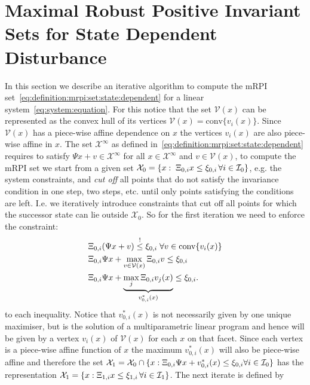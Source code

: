 \documentclass[letterpaper, 10pt, conference]{ieeeconf/ieeeconf} %
\providecommand{\conv}{\text{conv}}
\begin{document}
\section{Maximal Robust Positive Invariant Sets for State Dependent Disturbance}
In this section we describe an iterative algorithm to compute the mRPI 
set~\eqref{eq:definition:mrpi:set:state:dependent} for a linear system~\eqref{eq:system:equation}.
For this notice that the set $\mathcal V(x)$ can be represented as the convex hull of its vertices 
$\mathcal V(x) = \conv\{v_i(x)\}$. Since ${\mathcal{V}}(x)$
has a piece-wise affine dependence on $x$ the vertices $v_i(x)$ are also piece-wise affine in $x$.
The set $\mathcal X^\infty$ as defined in~\eqref{eq:definition:mrpi:set:state:dependent} 
requires to satisfy $\Psi x + v\in\mathcal X^\infty$ for all
$x\in\mathcal X^\infty$ and $v\in\mathcal V(x)$, to compute the mRPI set we start from a given set
$\mathcal X_0 = \{x:\;\Xi_{0,i}x\leq \xi_{0,i}\,\forall i\in\mathcal I_0\}$, e.g.
the system constraints, and 
\emph{cut off} all points that do not satisfy the invariance condition in one step, two steps, 
etc. until only points satisfying the conditions are left. I.e. we iteratively introduce 
constraints that cut off all points for which the successor state can lie outside 
$\mathcal X_0$. So for the first iteration we need to enforce the constraint:
\begin{equation}\begin{split}
	&\genmat_{0,i}(\Psi x + v)\overset{!}{\leq}\genvec_{0,i}\;\forall v\in\conv\{v_i(x)\}\\
	&\genmat_{0,i}\Psi x + \max_{v\in\mathcal V(x)} \genmat_{0,i} v \leq \genvec_{0,i}\\
	&\genmat_{0,i}\Psi x + \underbrace{\max_{j} \genmat_{0,i} v_j(x)}_{v_{0,i}^\ast(x)} \leq \genvec_{0,i}.
\end{split}\end{equation}
to each inequality.
Notice that $v_{0,i}^\ast(x)$ is not necessarily given by one unique maximiser, 
but is the solution of a multiparametric linear program and hence will be given 
by a vertex $v_i(x)$ of $\mathcal V(x)$ for each $x$ on that facet.
Since each vertex is a piece-wise affine function of $x$ the maximum $v_{0,i}^\ast(x)$ will also
be piece-wise affine
and therefore the set $\mathcal X_1=\mathcal X_0 \cap \{x:\Xi_{0,i}\Psi x + v_{0,i}^\ast(x) \leq 
\xi_{0,i}\forall i\in\mathcal I_0\}$
has the representation $\mathcal X_1 = \{x:\Xi_{1,i}x\leq\xi_{1,i}\,\forall i\in\mathcal I_1\}$.
The next iterate is defined by
\end{document}
